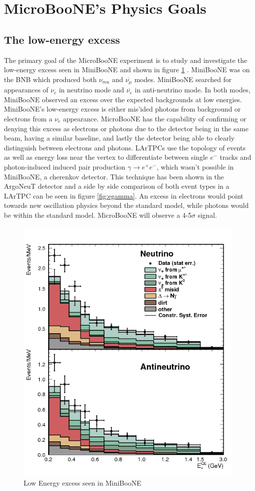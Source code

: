 \section{MicroBooNE's Physics Goals} 
\subsection{The low-energy excess}
The primary goal of the MicroBooNE experiment is to study and investigate the low-energy excess seen in MiniBooNE and shown in figure \ref{fig:lee} \cite{miniboone1} \cite{miniboone2}. MiniBooNE was on the BNB which produced both $\nu_{mu}$ and $\overline{\nu_{\mu}}$ modes. MiniBooNE searched for appearances of $\nu_e$ in neutrino mode and $\overline{\nu_e}$ in anti-neutrino mode. In both modes, MiniBooNE observed an excess over the expected backgrounds at low energies. MiniBooNE's low-energy excess is either mis'ided photons from background or electrons from a $\nu_e$ appearance. MicroBooNE has the capability of confirming or denying this excess as electrons or photons due to the detector being in the same beam, having a similar baseline, and lastly the detector being able to clearly distinguish between electrons and photons. LArTPCs use the topology of events as well as energy loss near the vertex to differentiate between single $e^-$ tracks and photon-induced induced pair production $\gamma \rightarrow e^+e^-$, which wasn't possible in MiniBooNE, a cherenkov detector. This technique has been shown in the ArgoNeuT detector and a side by side comparison of both event types in a LArTPC can be seen in figure \ref{fig:egamma}. An excess in electrons would point towards new oscillation physics beyond the standard model, while photons would be within the standard model. MicroBooNE will observe a 4-5$\sigma$ signal.  

\begin{figure}[htp!]
\centering
\includegraphics[width=.5\textwidth]{figs/lee.png}
\caption{Low Energy excess seen in MiniBooNE \cite{miniboone1}}
\label{fig:lee}
\end{figure}

